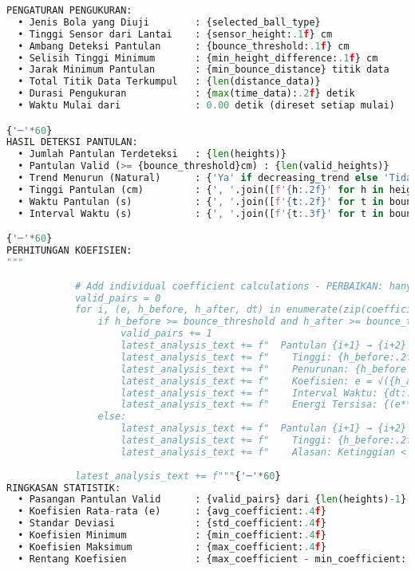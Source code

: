 \begin{itemize}
\begin{scriptsize}
\begin{lstlisting}[language=python]
PENGATURAN PENGUKURAN:
  • Jenis Bola yang Diuji        : {selected_ball_type}
  • Tinggi Sensor dari Lantai    : {sensor_height:.1f} cm
  • Ambang Deteksi Pantulan      : {bounce_threshold:.1f} cm
  • Selisih Tinggi Minimum       : {min_height_difference:.1f} cm
  • Jarak Minimum Pantulan       : {min_bounce_distance} titik data
  • Total Titik Data Terkumpul   : {len(distance_data)}
  • Durasi Pengukuran            : {max(time_data):.2f} detik
  • Waktu Mulai dari             : 0.00 detik (direset setiap mulai)

{'─'*60}
HASIL DETEKSI PANTULAN:
  • Jumlah Pantulan Terdeteksi   : {len(heights)}
  • Pantulan Valid (>= {bounce_threshold}cm) : {len(valid_heights)}
  • Trend Menurun (Natural)      : {'Ya' if decreasing_trend else 'Tidak'}
  • Tinggi Pantulan (cm)         : {', '.join([f'{h:.2f}' for h in heights])}
  • Waktu Pantulan (s)           : {', '.join([f'{t:.2f}' for t in bounce_times])}
  • Interval Waktu (s)           : {', '.join([f'{t:.3f}' for t in bounce_intervals])}

{'─'*60}
PERHITUNGAN KOEFISIEN:
"""
            
            # Add individual coefficient calculations - PERBAIKAN: hanya untuk pantulan valid
            valid_pairs = 0
            for i, (e, h_before, h_after, dt) in enumerate(zip(coefficients, heights[:-1], heights[1:], bounce_intervals)):
                if h_before >= bounce_threshold and h_after >= bounce_threshold:
                    valid_pairs += 1
                    latest_analysis_text += f"  Pantulan {i+1} → {i+2} (VALID - MENURUN):\n"
                    latest_analysis_text += f"    Tinggi: {h_before:.2f} cm → {h_after:.2f} cm\n"
                    latest_analysis_text += f"    Penurunan: {h_before - h_after:.2f} cm\n"
                    latest_analysis_text += f"    Koefisien: e = √({h_after:.2f}/{h_before:.2f}) = {e:.3f}\n"
                    latest_analysis_text += f"    Interval Waktu: {dt:.3f} detik\n"
                    latest_analysis_text += f"    Energi Tersisa: {(e**2)*100:.1f}%\n\n"
                else:
                    latest_analysis_text += f"  Pantulan {i+1} → {i+2} (DIABAIKAN):\n"
                    latest_analysis_text += f"    Tinggi: {h_before:.2f} cm → {h_after:.2f} cm\n"
                    latest_analysis_text += f"    Alasan: Ketinggian < {bounce_threshold}cm\n\n"
            
            latest_analysis_text += f"""{'─'*60}
RINGKASAN STATISTIK:
  • Pasangan Pantulan Valid      : {valid_pairs} dari {len(heights)-1} total
  • Koefisien Rata-rata (e)      : {avg_coefficient:.4f}
  • Standar Deviasi              : {std_coefficient:.4f}
  • Koefisien Minimum            : {min_coefficient:.4f}
  • Koefisien Maksimum           : {max_coefficient:.4f}
  • Rentang Koefisien            : {max_coefficient - min_coefficient:.4f}


\end{lstlisting}
\end{scriptsize}
\end{itemize}
